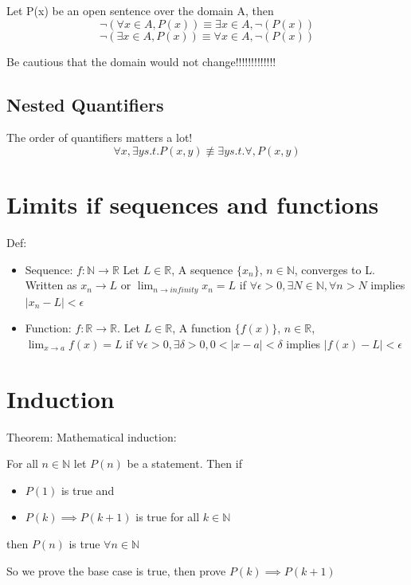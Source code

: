 \documentclass[letterpaper,12pt]{article}
\begin{document}
Let P(x) be an open sentence over the domain A, then
\[
\lnot (\forall x\in A, P(x))\equiv \exists x \in A, \lnot(P(x))    
\]
\[
  \lnot (\exists x\in A, P(x))\equiv \forall x \in A, \lnot (P(x))  
\]

Be cautious that the domain would not change!!!!!!!!!!!!!

\subsection{Nested Quantifiers}
The order of quantifiers matters a lot! 
\[
\forall x, \exists y s.t. P(x,y)\not \equiv \exists y s.t. \forall, P(x,y)    
\]

\section{Limits if sequences and functions}

Def:
\begin{itemize}
    \item Sequence: $f:\mathbb{N} \rightarrow \mathbb{R}$
    Let $L\in\mathbb{R}$, A sequence $\{x_n\}$, $n\in\mathbb{N}$, converges to L.
    Written as $x_n\rightarrow L$ or $\lim_{n\rightarrow infinity}x_n = L$ 
    if $\forall \epsilon > 0, \exists N\in \mathbb{N}, \forall n > N$ implies $|x_n-L|<\epsilon$
    
    \item Function: $f:\mathbb{R} \rightarrow \mathbb{R}$. 
    Let $L\in\mathbb{R}$, A function $\{f(x)\}$, $n\in\mathbb{R}$, $\lim_{x\rightarrow a}f(x)=L$
    if $\forall \epsilon > 0, \exists \delta >0, 0<|x-a|<\delta$ implies $|f(x)-L|<\epsilon$

\end{itemize}

\section{Induction}

Theorem: Mathematical induction:

For all $n \in \mathbb{N}$ let $P(n)$ be a statement. Then if 
\begin{itemize}
    \item $P(1)$ is true and 
    \item $P(k)\implies P(k+1)$ is true for all $k \in \mathbb{N}$
\end{itemize}
then $P(n)$ is true $\forall n \in \mathbb{N}$

So we prove the base case is true, then prove $P(k)\implies P(k+1)$
\end{document}
